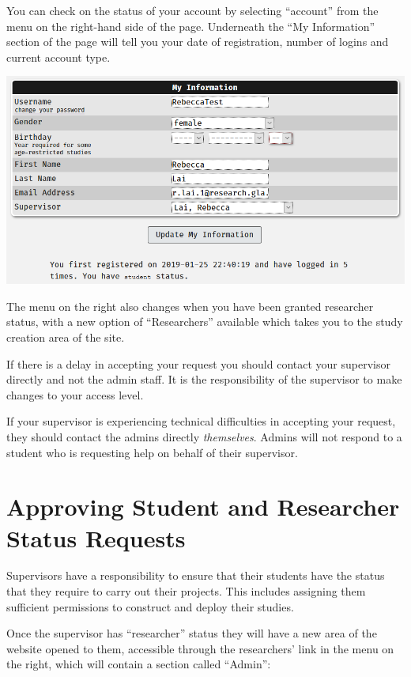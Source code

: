 \documentclass[]{book}
\begin{document}
You can check on the status of your account by selecting ``account'' from the menu on the right-hand side of the page. Underneath the ``My Information'' section of the page will tell you your date of registration, number of logins and current account type.

\includegraphics{images/screenshots/check_status.png}

The menu on the right also changes when you have been granted researcher status, with a new option of ``Researchers'' available which takes you to the study creation area of the site.

\begin{info}
If there is a delay in accepting your request you should contact your
supervisor directly and not the admin staff. It is the responsibility of
the supervisor to make changes to your access level.

If your supervisor is experiencing technical difficulties in accepting
your request, they should contact the admins directly \emph{themselves}.
Admins will not respond to a student who is requesting help on behalf of
their supervisor.
\end{info}

\hypertarget{approving-student-and-researcher-status-requests}{%
\section{Approving Student and Researcher Status Requests}\label{approving-student-and-researcher-status-requests}}

Supervisors have a responsibility to ensure that their students have the status that they require to carry out their projects. This includes assigning them sufficient permissions to construct and deploy their studies.

Once the supervisor has ``researcher'' status they will have a new area of the website opened to them, accessible through the researchers' link in the menu on the right, which will contain a section called ``Admin'':
\end{document}
